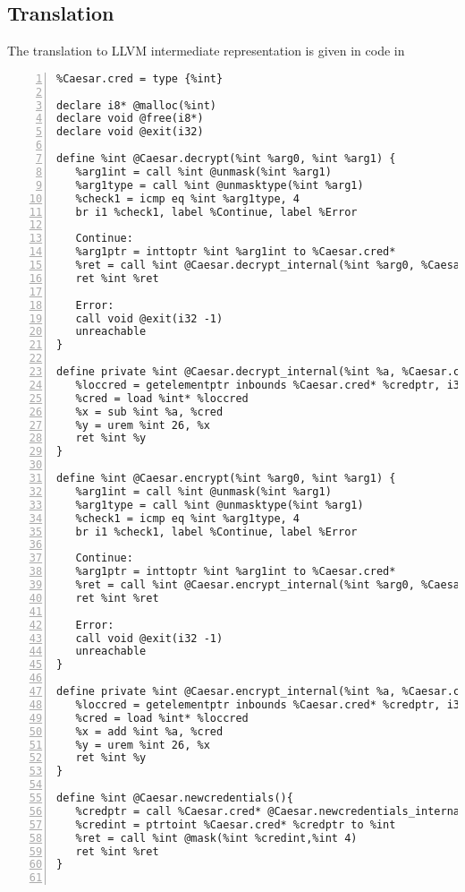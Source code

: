 \subsection{Translation}
The translation to LLVM intermediate representation is given in code in 

\begin{lstlisting}[frame=single,numbers=left, language={[x86masm]Assembler}, caption={[LLVM Translation Caesar Cipher Example]LLVM IR for the example.},
label=llvm:Example]
%int = type i64
%Caesar.cred = type {%int}

declare i8* @malloc(%int)
declare void @free(i8*)
declare void @exit(i32)

define %int @Caesar.decrypt(%int %arg0, %int %arg1) {
   %arg1int = call %int @unmask(%int %arg1)
   %arg1type = call %int @unmasktype(%int %arg1)
   %check1 = icmp eq %int %arg1type, 4
   br i1 %check1, label %Continue, label %Error
   
   Continue:
   %arg1ptr = inttoptr %int %arg1int to %Caesar.cred*
   %ret = call %int @Caesar.decrypt_internal(%int %arg0, %Caesar.cred* %arg1ptr)
   ret %int %ret
   
   Error:
   call void @exit(i32 -1)
   unreachable
}

define private %int @Caesar.decrypt_internal(%int %a, %Caesar.cred* %credptr) {
   %loccred = getelementptr inbounds %Caesar.cred* %credptr, i32 0, i32 0
   %cred = load %int* %loccred 
   %x = sub %int %a, %cred
   %y = urem %int 26, %x 
   ret %int %y
}

define %int @Caesar.encrypt(%int %arg0, %int %arg1) {
   %arg1int = call %int @unmask(%int %arg1)
   %arg1type = call %int @unmasktype(%int %arg1)
   %check1 = icmp eq %int %arg1type, 4
   br i1 %check1, label %Continue, label %Error
   
   Continue:
   %arg1ptr = inttoptr %int %arg1int to %Caesar.cred*
   %ret = call %int @Caesar.encrypt_internal(%int %arg0, %Caesar.cred* %arg1ptr)
   ret %int %ret
   
   Error:
   call void @exit(i32 -1)
   unreachable
}

define private %int @Caesar.encrypt_internal(%int %a, %Caesar.cred* %credptr) {
   %loccred = getelementptr inbounds %Caesar.cred* %credptr, i32 0, i32 0
   %cred = load %int* %loccred
   %x = add %int %a, %cred
   %y = urem %int 26, %x
   ret %int %y
}

define %int @Caesar.newcredentials(){
   %credptr = call %Caesar.cred* @Caesar.newcredentials_internal()
   %credint = ptrtoint %Caesar.cred* %credptr to %int
   %ret = call %int @mask(%int %credint,%int 4)
   ret %int %ret
}


\end{lstlisting}
